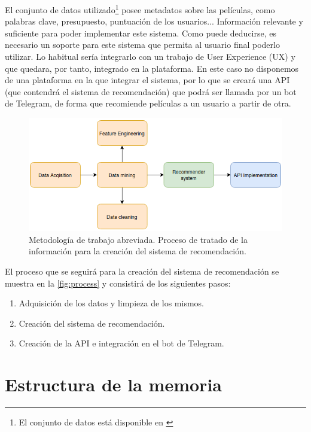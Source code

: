 El conjunto de datos utilizado\footnote{El conjunto de datos está disponible en \cite{kaggle}} posee metadatos sobre las películas, como palabras clave, presupuesto, puntuación de los usuarios... Información relevante y suficiente para poder implementar este sistema. Como puede deducirse, es necesario un soporte para este sistema que permita al usuario final poderlo utilizar. Lo habitual sería integrarlo con un trabajo de User Experience (UX) y que quedara, por tanto, integrado en la plataforma. En este caso no disponemos de una plataforma en la que integrar el sistema, por lo que se creará una API (que contendrá el sistema de recomendación) que podrá ser llamada por un bot de Telegram, de forma que recomiende películas a un usuario a partir de otra.\\

\begin{figure}[h]
    \centering
    \captionsetup{width=10cm}
    \includegraphics[width=12cm]{contenido/imagenes/initial.png}
    \caption{Metodología de trabajo abreviada. Proceso de tratado de la información para la creación del sistema de recomendación.}
    \label{fig:process}
\end{figure}

El proceso que se seguirá para la creación del sistema de recomendación se muestra en la \autoref{fig:process} y consistirá de los siguientes pasos:
\begin{enumerate}
    \item Adquisición de los datos y limpieza de los mismos.
    \item Creación del sistema de recomendación.
    \item Creación de la API e integración en el bot de Telegram.
\end{enumerate}
\section{Estructura de la memoria}\label{sec:estructura}

